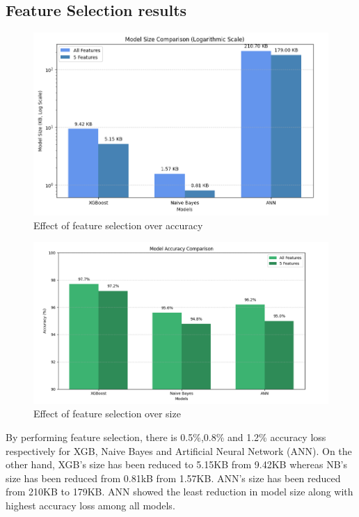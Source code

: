 \documentclass[conference,letterpaper]{IEEEtran}
\begin{document}
\subsection{Feature Selection results}
\begin{figure}[h]
    \centering
    \includegraphics[width=\linewidth]{effect_FS_over_accuracy.png}
    \caption{Effect of feature selection over accuracy}
    \label{fig:fs_acc}
\end{figure}
\begin{figure}[h]
    \centering
    \includegraphics[width=\linewidth]{effect_FS_over_size.png}
    \caption{Effect of feature selection over size}
    \label{fig:fs_size}
\end{figure}
By performing feature selection, there is 0.5\%,0.8\% and 1.2\% accuracy loss respectively for XGB, Naive Bayes and Artificial Neural Network (ANN). On the other hand, XGB's size has been reduced to 5.15KB from 9.42KB whereas NB's size has been reduced from 0.81kB from 1.57KB. ANN's size has been reduced from 210KB to 179KB. ANN showed the least reduction in model size along with highest accuracy loss among all models. 
\end{document}
